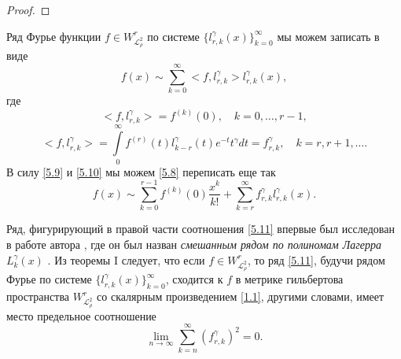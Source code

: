 \begin{proof}
\end{proof}

Ряд Фурье функции $f\in W^r_{\mathcal{ L}^2_\rho}$ по системе $\{l_{r,k}^{\gamma}(x)\}_{k=0}^\infty$
мы можем записать в виде
\begin{equation}\label{5.8}
f(x)\sim  \sum_{k=0}^\infty <f,l_{r,k}^\gamma>  l_{r,k}^\gamma(x),
     \end{equation}
где
\begin{equation}\label{5.9}
<f,l_{r,k}^\gamma>=f^{(k)}(0),\quad k=0,\ldots, r-1,
     \end{equation}
\begin{equation}\label{5.10}
<f,l_{r,k}^\gamma>=\int\limits_0^\infty f^{(r)}(t) l_{k-r}^\gamma(t)e^{-t}t^\gamma dt=f_{r,k}^\gamma,\quad k=r,r+1,\ldots.
     \end{equation}
В силу \eqref{5.9}  и \eqref{5.10} мы можем \eqref{5.8} переписать еще так
\begin{equation}\label{5.11}
f(x)\sim \sum_{k=0}^{r-1} f^{(k)}(0)\frac{x^k}{k!}+ \sum_{k=r}^\infty f_{r,k}^\gamma l_{r,k}^\gamma(x).
\end{equation}

Ряд, фигурирующий в правой части соотношения \eqref{5.11} впервые был исследован в работе автора \cite{Shar13}, где он был назван \textit{ смешанным рядом по полиномам Лагерра $L_{k}^\gamma(x)$ }. Из теоремы I следует, что если   $f\in W^r_{\mathcal{ L}^2_\rho}$, то ряд \eqref{5.11}, будучи  рядом Фурье  по системе $\{l_{r,k}^{\gamma}(x)\}_{k=0}^\infty$, сходится к $f$ в метрике гильбертова пространства $W^r_{\mathcal{ L}^2_\rho}$ со скалярным произведением \eqref{1.1}, другими словами, имеет место предельное соотношение
 \begin{equation*}
 \lim_{n\to\infty}\sum_{k=n}^\infty (f_{r,k}^\gamma)^2= 0 .
\end{equation*}

